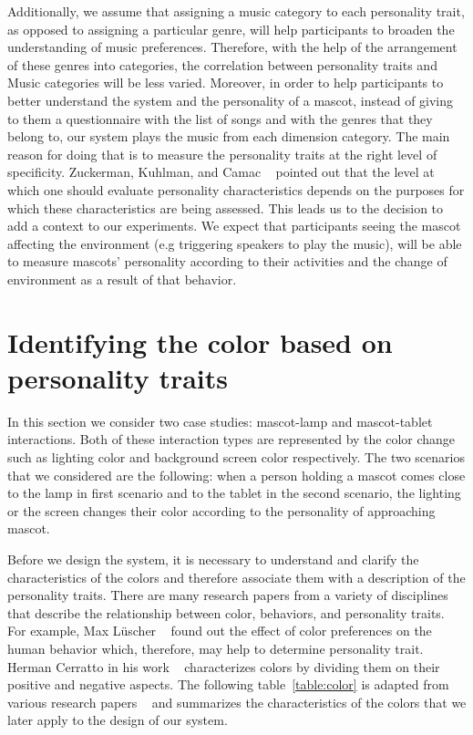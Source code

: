 \par Additionally, we assume that assigning a music category to each personality trait,
as opposed to assigning a particular genre, will help participants to broaden the understanding of music preferences.
Therefore, with the help of the arrangement of these genres into categories,
the correlation between personality traits and Music categories will be less varied.
Moreover, in order to help participants to better understand the system and the personality of a mascot,
instead of giving to them a questionnaire with the list of songs and with the genres that they
belong to, our system plays the music from each dimension category.
The main reason for doing that is to measure the personality traits at the right level of specificity.
Zuckerman, Kuhlman, and Camac ~\cite{zuckerman1988lies} pointed out that the level at which one
should evaluate personality characteristics depends on the purposes for which these characteristics are being assessed.
This leads us to the decision to add a context to our experiments.
We expect that participants seeing the mascot affecting the environment
(e.g triggering speakers to play the music), will be able to measure mascots'
personality according to their activities and the change of environment as a result of that behavior.

\section{Identifying the color based on personality traits}
\label{sec:Identifying the color based on personality traits}

In this section we consider two case studies: mascot-lamp and mascot-tablet interactions.
Both of these interaction types are represented by the color change such as
lighting color and background screen color respectively.
The two scenarios that we considered are the following: when a person holding a mascot comes close
to the lamp in first scenario and to the tablet in the second scenario, the lighting
or the screen changes their color according to the personality of approaching mascot.

Before we design the system, it is necessary to understand and clarify the characteristics
of the colors and therefore associate them with a description of the personality traits.
There are many research papers from a variety of disciplines that describe the
relationship between color, behaviors, and personality traits.
For example, Max Lüscher ~\cite{luscher1971luscher} found out the effect of
color preferences on the human behavior which, therefore, may help to determine personality trait.
Herman Cerratto in his work ~\cite{cerrato2012meaning} characterizes colors by
dividing them on their positive and negative aspects.
The following table~\ref{table:color} is adapted from various research
papers ~\cite{luscher1971luscher,cerrato2012meaning,schaie1964color} and
summarizes the characteristics of the colors that we later apply to the design of our system.

